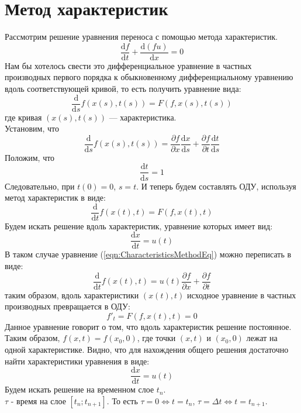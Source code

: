 \documentclass[10pt,a4paper]{article}
\begin{document}
\section{Метод характеристик}
\begin{comment}
https://ru.wikipedia.org/wiki/%
\end{comment}
Рассмотрим решение уравнения переноса с помощью метода характеристик.
\begin{equation}
\frac{\text{d}f}{\text{d}t} + \frac{\text{d}(f u)}{\text{d}x}=0
\end{equation}
Нам бы хотелось свести это дифференциальное уравнение в частных производных первого порядка к обыкновенному дифференциальному уравнению вдоль соответствующей кривой, то есть получить уравнение вида:
\[
\frac{\text{d}}{\text{d}s}f(x(s),t(s))=F(f,x(s),t(s))
\]
где кривая $(x(s),t(s))$ — характеристика.\\
Установим, что
\begin{equation}
\label{eqn:CharacteristicsMethodEq}
\frac{\text{d}}{\text{d}s}f(x(s),t(s))=\frac{\partial f}{\partial x}\frac{\text{d}x}{\text{d}s}+\frac{\partial f}{\partial t}\frac{\text{d}t}{\text{d}s}
\end{equation}
Положим, что
\[
\frac{\text{d}t}{\text{d}s}=1
\]
Следовательно, при $t(0)=0$, $s=t$. И теперь будем составлять ОДУ, используя метод характеристик в виде:
\[
\frac{\text{d}}{\text{d}t}f(x(t),t)=F(f,x(t),t)
\]
Будем искать решение вдоль характеристик, уравнение которых имеет вид:
\[
\frac{\text{d}x}{\text{d}t}=u(t)
\]
В таком случае уравнение (\ref{eqn:CharacteristicsMethodEq}) можно переписать в виде:
\[
\frac{\text{d}}{\text{d}t}f(x(t),t)=u(t)\frac{\partial f}{\partial x}+\frac{\partial f}{\partial t}
\]
таким образом, вдоль характеристики $(x(t),t)$ исходное уравнение в частных производных превращается в ОДУ:
\[
f'_t=F(f,x(t),t)=0
\]
Данное уравнение говорит о том, что вдоль характеристик решение постоянное. Таким образом, $f(x,t)=f(x_0,0)$, где точки $(x,t)$ и $(x_0,0)$ лежат на одной характеристике. Видно, что для нахождения общего решения достаточно найти характеристики уравнения в виде:
\begin{equation}
\label{eqn:CharacteristicsEq}
\frac{\text{d}x}{\text{d}t}=u(t)
\end{equation}
Будем искать решение на временном слое $t_n$.
\\$\tau$ - время на слое $[t_n; t_{n+1}]$. То есть $\tau=0 \Leftrightarrow t=t_n$, $\tau=\Delta t \Leftrightarrow t=t_{n+1}$.
\end{document}
